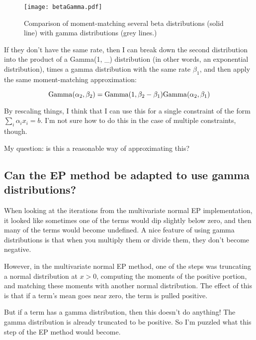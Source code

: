\documentclass[12]{article}
\begin{document}
\begin{figure}[htp]
\centering
\texttt{[image: betaGamma.pdf]}
\caption{
Comparison of moment-matching several beta distributions (solid line) with
gamma distributions (grey lines.)
}
\label{fig:betaGamma}
\end{figure}

If they don't have the same rate, then I can break down the second distribution into
the product of a Gamma(1, \_) distribution (in other words,
an exponential distribution), times a
gamma distribution with the same rate $\beta_1$, and then apply the same
moment-matching approximation:

\[
{\rm Gamma}(\alpha_2, \beta_2) = {\rm Gamma}(1, \beta_2 - \beta_1){\rm Gamma}(\alpha_2, \beta_1)
\]

By rescaling things, I think that I can use this for a single constraint of the
form $\sum_i \alpha_i x_i = b$. I'm not sure how to do this in the case of
multiple constraints, though.

My question: is this a reasonable way of approximating this?

\subsection*{Can the EP method be adapted to use gamma distributions?}

When looking at the iterations from the multivariate normal EP implementation,
it looked like sometimes one of the terms would dip
slightly below zero, and then many of the terms would become undefined.
A nice feature of using gamma distributions is that when you multiply them
or divide them, they don't become negative.

However, in the multivariate normal EP method, one of the steps was 
truncating a normal distribution at $x > 0$, computing the moments of
the positive portion, and matching these moments with another normal
distribution. The effect of this is that if a term's mean goes near zero, the
term is pulled positive.

But if a term has a gamma distribution, then this doesn't do anything! The gamma
distribution is already truncated to be positive. So I'm puzzled what this step
of the EP method would become.



\end{document}
